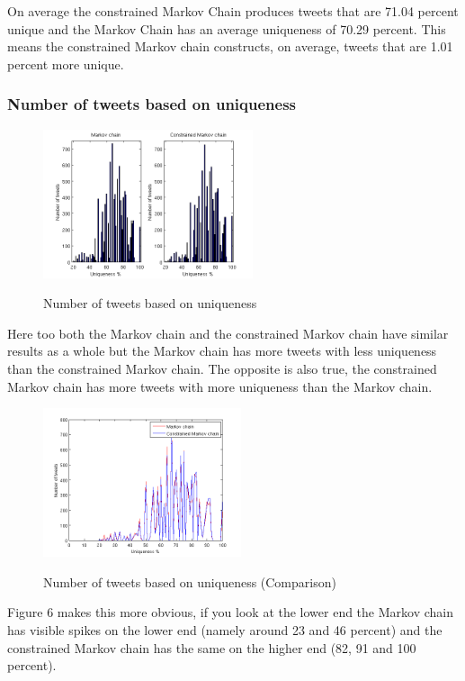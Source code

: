 \documentclass[a4paper,12pt]{article}
\begin{document}
On average the constrained Markov Chain produces tweets that are 71.04 percent unique and the Markov Chain has an average uniqueness of 70.29 percent. This means the constrained Markov chain constructs, on average, tweets that are 1.01 percent more unique.
\newpage
\subsubsection{Number of tweets based on uniqueness}
\begin{figure}[h!]
\hfill
{\includegraphics[width=1\linewidth, height = 165]{NumTweetsByUniq.png}}
\caption{Number of tweets based on uniqueness}
\end{figure}
Here too both the Markov chain and the constrained Markov chain have similar results as a whole but the Markov chain has more tweets with less uniqueness than the constrained Markov chain. The opposite is also true, the constrained Markov chain has more tweets with more uniqueness than the Markov chain.
\begin{figure}[h!]
\hfill
{\includegraphics[width=1\linewidth, height = 165]{NumTweetsByUniq2.png}}
\hfill
\caption{Number of tweets based on uniqueness (Comparison)}
\end{figure}
Figure 6 makes this more obvious, if you look at the lower end the Markov chain has visible spikes on the lower end (namely around 23 and 46 percent) and the constrained Markov chain has the same on the higher end (82, 91 and 100 percent).
\end{document}
